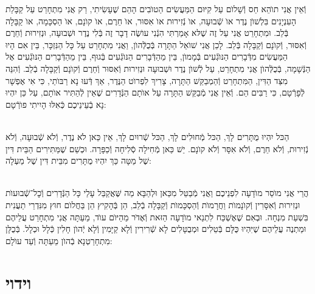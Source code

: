 \documentclass[twoside, openany, parskip=half, 11pt]{book}
\begin{document}
וְֿאֵין אֲנִי תוׂהֵא חַס וְֿשָׁלוׂם עַל קִיּוּם הַמַּעֲשִׂים הַטוׂבִים הָהֵם שֶׁעָשִׂיתִי, רַק אֲנִי מִתְחָרֵט עַל קַבָּלַת הָעִנְיָנִים בִּלְשׁוׂן נֶדֶר אוׂ שְֿׁבוּעָה, אוׂ נְֿזִירוּת אוׂ אִסּוּר, אוׂ חֵרֶם, אוׂ קוׂנָם, אוׂ הַסְכָּמָה, אוׂ קַבָּלָה בְּֿלֵב. וּמִתְחָרֵט אֲנִי עַל זֶה שֶׁלּא אָמַרְתִּי הִנְֿנִי עוׂשֶׂה דָבָר זֶה בְּֿלִי נֶדֶר וּשְׁבוּעָה, וּנְזִירוּת וְֿחֵרֶם וְֿאִסּוּר, וְֿקוׂנָם וְֿקַבָּלָה בְּֿלֵב. לָכֵן אֲנִי שׁוׂאֵל הַתָּרָה בְּֿכֻלְּֿהוׂן, וַאֲנִי מִתְחָרֵט עַל כָּל הַנִּזְכָּר, בֵּין אִם הָיוּ הַמַּעֲשִׂים מִדְּֿבָרִים הַנּוׂגְֿעִים בְּֿמָמוׂן, בֵּין מֵהַדְּֿבָרִים הַנּוׂגְֿעִים בְּֿגוּף, בֵּין מֵהַדְּֿבָרִים הַנּוׂגְֿעִים אֶל הַנְּֿשָׁמָה, בְּֿכֻלְּֿהוׂן אֲנִי מִתְחָרֵט, עַל לְֿשׁוׂן נֶדֶר וּשְׁבוּעָה וּנְזִירוּת וְֿאִסּוּר וְֿחֵרֶם וְֿקוׂנָם וְֿקַבָּלָה בְֿלֵב. וְֿהִנֵּה מִצַּד הַדִּין, הַמִּתְחָרֵט וְֿהַמְבַקֵּשׁ הַתָּרָה, צָרִיךְ לִפְרוׂט הַנֶּדֶר, אַךְ דְּֿעוּ נָא רַבּוׂתַי, כִּי אִי אֶפְשָׁר לְֿפָרְֿטָם, כִּי רַבִּים הֵם. וְֿאֵין אֲנִי מְֿבַקֵּשׁ הַתָּרָה עַל אוׂתָם הַנְּֿדָרִים שֶׁאֵין לְֿהַתִּיר אוׂתָם, עַל כֵּן יִהְיוּ נָא בְֿעֵינֵיכֶם כְּֿאִלּוּ הָיִיתִי פוׂרְֿטָם:

\\
הַכּל יִהְיוּ מֻתָּרִים לָךְ, הַכּל מְֿחוּלִים לָךְ, הַכּל שְֿׁרוּיִם לָךְ, אֵין כַּאן לֺא נֶדֶר, וְֿלֺא שְֿׁבוּעָה, וְֿלֺא נְֿזִירוּת, וְֿלֺא חֵרֶם, וְֿלֺא אִסָּר וְֿלֺא קוׂנָם. יֵשׁ כַּאן מְֿחִילָה סְֿלִיחָה וְֿכַפָּרָה. וּכְשֵׁם שֶׁמַּתִּירִים הַבֵּית דִּין שֶׁל מַטָּה כַּךְ יִהְיוּ מֻתָּרִים מִבֵּית דִּין שֶׁל מַעְלָה:

\\
הֲרֵי אֲנִי מוֺסֵר מוׂדָעָה לִפְנֵיכֶם וַאֲנִי מְֿבַטֵּל מִכַּאן וּלְהַבָּא מַה שֶּׁאֲקַבֵּל עָלַי כָּל הַנְּֿדָרִים וְֿכׇל־שְֿׁבוּעוׂת וּנְזִירוּת וְֿאִסָּרִין וְֿקוׂנָמוׂת וַחֲרָמוׂת וְֿהַסְכָּמוׂת וְֿקַבָּלָה בְֿלֵב, הֵן בְּֿהָקִיץ הֵן בַּחֲלוׂם חוּץ מִנִּדְרֵי תַעֲנִית בִּשְׁעַת מִנְחָה. וּבְאִם שֶׁאֶשְׁכַּח לִתְנַאי מוׂדָעָה הַזּאת וְֿאֶדּׂר מֵהַיּוׂם עוׂד, מֵעַתָּה אֲנִי מִתְחָרֵט עֲלֵיהֶם וּמַתְנֶה עֲלֵיהֶם שֶׁיִּהְיוּ כֻּלָּם בְּֿטֵלִים וּמְבֻטָּלִים לָא שְֿׁרִירִין וְֿלָא קַיָּמִין וְֿלָא יְֿהוׂן חָלִין כְּֿלָל וּכְלָל. בְּֿכֻלָּן מִתְחָרַטְנָא בְֿהוׂן מֵעַתָּה וְֿעַד עוׂלָם:

\vfill
\sepline




\chapter[וידוי]{ וידוי }
\end{document}
